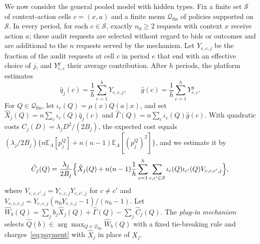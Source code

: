 \documentclass[opre,dblanonrev]{informs4}
\providecommand{\E}{\mathbb{E}}
\providecommand{\1}{\mathbf{1}}
\begin{document}
We now consider the general pooled model with hidden types. Fix a finite set $\mathcal S$ of context-action cells $c=(x,a)$ and a finite menu $\mathcal Q_{\mathrm{fin}}$ of policies supported on $\mathcal S$. In every period, for each $c\in\mathcal S$, exactly $n_0\ge2$ requests with context $x$ receive action $a$; these audit requests are selected without regard to bids or outcomes and are additional to the $n$ requests served by the mechanism. Let $Y_{e,c,j}$ be the fraction of the audit requests at cell $c$ in period $e$ that end with an effective choice of $j$, and $Y^g_{e,c}$ their average contribution. After $h$ periods, the platform estimates
\[
\hat q_j(c)=\frac1h\sum_{e=1}^hY_{e,c,j},\qquad\hat g(c)=\frac1h\sum_{e=1}^hY^g_{e,c}.
\]
For $Q\in\mathcal Q_{\mathrm{fin}}$, let $\iota_c(Q)=\mu(x)Q(a\mid x)$, and set $\hat X_j(Q)=n\sum_c\iota_c(Q)\hat q_j(c)$ and $\hat\Gamma(Q)=n\sum_c\iota_c(Q)\hat g(c)$. With quadratic costs $C_j(D)=\lambda_jD^2/(2B_j)$, the expected cost equals $(\lambda_j/2B_j)\{n\E_\Lambda[p_j^Q]+n(n-1)\E_\Lambda[(p_j^Q)^2]\}$, and we estimate it by
\[
\hat C_j(Q)=\frac{\lambda_j}{2B_j}\Bigl\{\hat X_j(Q)+n(n-1)\frac1h\sum_{e=1}^h\sum_{c,c'\in\mathcal S}\iota_c(Q)\iota_{c'}(Q)V_{e,c,c',j}\Bigr\},
\]
where $V_{e,c,c',j}=Y_{e,c,j}Y_{e,c',j}$ for $c\ne c'$ and $V_{e,c,c,j}=Y_{e,c,j}(n_0Y_{e,c,j}-1)/(n_0-1)$. Let $\hat W_b(Q)=\sum_jb_j\hat X_j(Q)+\hat\Gamma(Q)-\sum_j\hat C_j(Q)$. The \emph{plug-in mechanism} selects $\hat Q(b)\in\arg\max_{Q\in\mathcal Q_{\mathrm{fin}}}\hat W_b(Q)$ with a fixed tie-breaking rule and charges~\eqref{eq:payment} with $\hat X_j$ in place of $X_j$.
\end{document}
